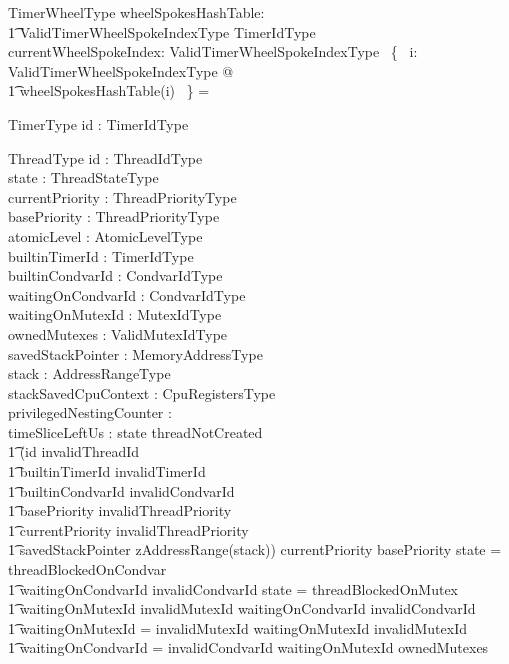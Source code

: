 \documentclass[11pt,letterpaper,twoside,openany]{book}
\begin{document}
\begin{schema}{TimerWheelType}
   wheelSpokesHashTable: \\
   \t1 ValidTimerWheelSpokeIndexType \fun \finset TimerIdType \\
   currentWheelSpokeIndex: ValidTimerWheelSpokeIndexType
\where
    \bigcap~\{~ i: ValidTimerWheelSpokeIndexType @ \\
    \t1 wheelSpokesHashTable(i) ~\} = \emptyset
\end{schema}

\begin{schema}{TimerType}
   id : TimerIdType
\end{schema}

\begin{schema}{ThreadType}
   id : ThreadIdType \\
   state : ThreadStateType \\
   currentPriority : ThreadPriorityType \\
   basePriority : ThreadPriorityType \\
   atomicLevel : AtomicLevelType \\
   builtinTimerId : TimerIdType \\
   builtinCondvarId : CondvarIdType \\
   waitingOnCondvarId : CondvarIdType \\
   waitingOnMutexId : MutexIdType \\
   ownedMutexes : \iseq ValidMutexIdType \\
   savedStackPointer : MemoryAddressType \\
   stack : AddressRangeType \\
   stackSavedCpuContext : CpuRegistersType \\
   privilegedNestingCounter : \nat \\
   timeSliceLeftUs : \nat
\where
   state \neq threadNotCreated \implies \\
   \t1 (id \neq invalidThreadId \land \\
   \t1 builtinTimerId \neq invalidTimerId \land \\
   \t1 builtinCondvarId \neq invalidCondvarId \land \\
   \t1 basePriority \neq invalidThreadPriority \land \\
   \t1 currentPriority \neq invalidThreadPriority \land \\
   \t1 savedStackPointer \in zAddressRange(stack))
\also
   currentPriority \geq basePriority
\also
   state = threadBlockedOnCondvar \iff \\
   \t1 waitingOnCondvarId \neq invalidCondvarId
\also
   state = threadBlockedOnMutex \iff \\
   \t1  waitingOnMutexId \neq invalidMutexId
\also
   waitingOnCondvarId \neq invalidCondvarId \implies \\
   \t1 waitingOnMutexId = invalidMutexId
\also
   waitingOnMutexId \neq invalidMutexId \implies \\
   \t1 waitingOnCondvarId = invalidCondvarId
\also
   waitingOnMutexId \notin \ran ownedMutexes
\end{schema}
\end{document}
